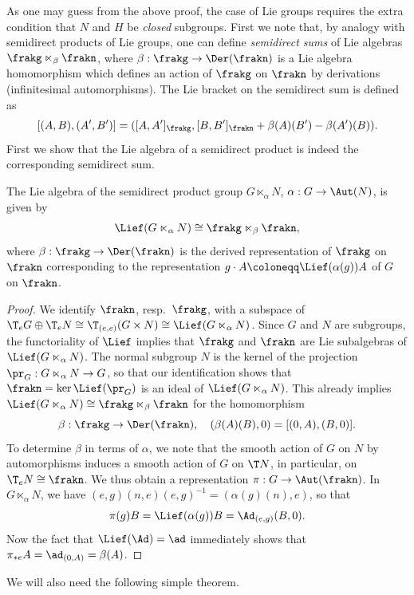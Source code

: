As one may guess from the above proof, the case of Lie groups requires the extra condition that $N$ and $H$ be \emph{closed} subgroups. First we note that, by analogy with semidirect products of Lie groups, one can define \emph{semidirect sums} of Lie algebras $\frakg\ltimes_\beta\frakn$, where $\beta:\frakg\to \Der(\frakn)$ is a Lie algebra homomorphism which defines an action of $\frakg$ on $\frakn$ by derivations (infinitesimal automorphisms). The Lie bracket on the semidirect sum is defined as 
\[[(A,B),(A',B')]=([A,A']_\frakg,[B,B']_\frakn+\beta(A)(B')-\beta(A')(B)).\]
First we show that the Lie algebra of a semidirect product is indeed the corresponding semidirect sum.

\begin{prop}[{\cite[Prop.~9.2.25]{HN}}]\label{prop 9.2.25 HN}
    The Lie algebra of the semidirect product group $G\ltimes_\alpha N$, $\alpha:G\to \Aut(N)$, is given by 
    \[\Lief(G\ltimes_\alpha N)\cong \frakg\ltimes_\beta\frakn,\]
    where $\beta:\frakg\to \Der(\frakn)$ is the derived representation of $\frakg$ on $\frakn$ corresponding to the representation $g\cdot A\coloneqq \Lief(\alpha(g))A$ of $G$ on $\frakn$.
\end{prop}
\begin{proof}
    We identify $\frakn$, resp.\ $\frakg$, with a subspace of $\T_e G\oplus\T_e N\cong\T_{(e,e)}(G\times N)\cong \Lief(G\ltimes_\alpha N)$. Since $G$ and $N$ are subgroups, the functoriality of $\Lief$ implies that $\frakg$ and $\frakn$ are Lie subalgebras of $\Lief(G\ltimes_\alpha N)$. The normal subgroup $N$ is the kernel of the projection $\pr_G:G\ltimes_\alpha N\to G$, so that our identification shows that $\frakn=\ker\Lief(\pr_G)$ is an ideal of $\Lief(G\ltimes_\alpha N)$. This already implies $\Lief(G\ltimes_\alpha N)\cong\frakg\ltimes_\beta\frakn$ for the homomorphism 
    \[\beta:\frakg\to\Der(\frakn),\quad (\beta(A)(B),0)=[(0,A),(B,0)].\]
    To determine $\beta$ in terms of $\alpha$, we note that the smooth action of $G$ on $N$ by automorphisms induces a smooth action of $G$ on $\T N$, in particular, on $\T_e N\cong \frakn$. We thus obtain a representation $\pi:G\to \Aut(\frakn)$. In $G\ltimes_\alpha N$, we have $(e,g)(n,e)(e,g)^{-1}=(\alpha(g)(n),e)$, so that 
    \[\pi(g)B=\Lief(\alpha(g))B=\Ad_{(e,g)}(B,0).\]
    Now the fact that $\Lief(\Ad)=\ad$ immediately shows that $\pi_{\ast e}A=\ad_{(0,A)}=\beta(A)$.
\end{proof}

We will also need the following simple theorem.

